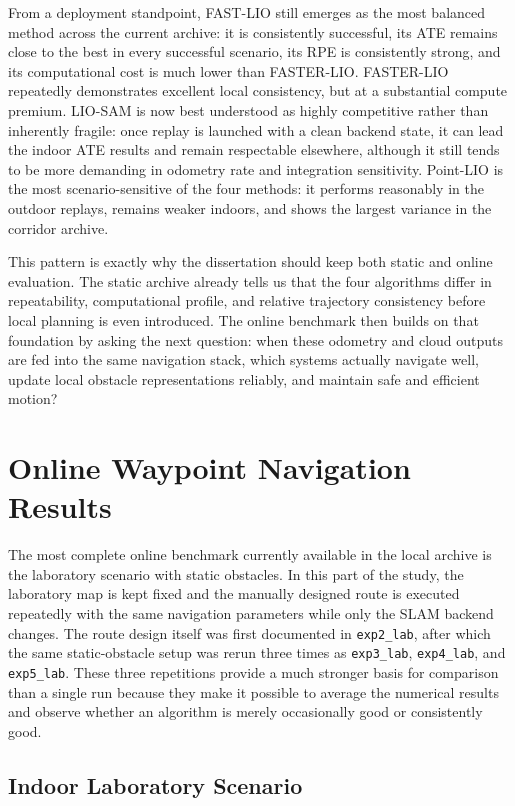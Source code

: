 \documentclass[12pt,a4paper]{report}
\begin{document}
From a deployment standpoint, FAST-LIO still emerges as the most balanced method across the current archive: it is consistently successful, its ATE remains close to the best in every successful scenario, its RPE is consistently strong, and its computational cost is much lower than FASTER-LIO. FASTER-LIO repeatedly demonstrates excellent local consistency, but at a substantial compute premium. LIO-SAM is now best understood as highly competitive rather than inherently fragile: once replay is launched with a clean backend state, it can lead the indoor ATE results and remain respectable elsewhere, although it still tends to be more demanding in odometry rate and integration sensitivity. Point-LIO is the most scenario-sensitive of the four methods: it performs reasonably in the outdoor replays, remains weaker indoors, and shows the largest variance in the corridor archive.

This pattern is exactly why the dissertation should keep both static and online evaluation. The static archive already tells us that the four algorithms differ in repeatability, computational profile, and relative trajectory consistency before local planning is even introduced. The online benchmark then builds on that foundation by asking the next question: when these odometry and cloud outputs are fed into the same navigation stack, which systems actually navigate well, update local obstacle representations reliably, and maintain safe and efficient motion?

\section{Online Waypoint Navigation Results}
The most complete online benchmark currently available in the local archive is the laboratory scenario with static obstacles. In this part of the study, the laboratory map is kept fixed and the manually designed route is executed repeatedly with the same navigation parameters while only the SLAM backend changes. The route design itself was first documented in \texttt{exp2\_lab}, after which the same static-obstacle setup was rerun three times as \texttt{exp3\_lab}, \texttt{exp4\_lab}, and \texttt{exp5\_lab}. These three repetitions provide a much stronger basis for comparison than a single run because they make it possible to average the numerical results and observe whether an algorithm is merely occasionally good or consistently good.

\subsection{Indoor Laboratory Scenario}
\end{document}
